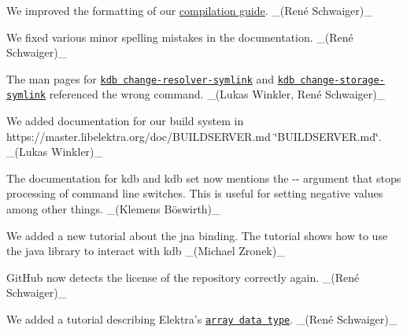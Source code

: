 \begin{DoxyItemize}
\item We improved the formatting of our \hyperlink{doc_COMPILE_md}{compilation guide}. \+\_\+(René Schwaiger)\+\_\+
\item We fixed various minor spelling mistakes in the documentation. \+\_\+(René Schwaiger)\+\_\+
\item The man pages for \href{https://www.libelektra.org/manpages/kdb-change-resolver-symlink}{\tt {\ttfamily kdb change-\/resolver-\/symlink}} and \href{https://www.libelektra.org/manpages/kdb-change-storage-symlink}{\tt {\ttfamily kdb change-\/storage-\/symlink}} referenced the wrong command. \+\_\+(Lukas Winkler, René Schwaiger)\+\_\+
\item We added documentation for our build system in https\+://master.libelektra.\+org/doc/\+B\+U\+I\+L\+D\+S\+E\+R\+V\+ER.md \char`\"{}\+B\+U\+I\+L\+D\+S\+E\+R\+V\+E\+R.\+md\char`\"{}. \+\_\+(\+Lukas Winkler)\+\_\+
\item The documentation for {\ttfamily kdb} and {\ttfamily kdb set} now mentions the {\ttfamily -\/-\/} argument that stops processing of command line switches. This is useful for setting negative values among other things. \+\_\+(Klemens Böswirth)\+\_\+
\item We added a new tutorial about the jna binding. The tutorial shows how to use the java library to interact with kdb \+\_\+(\+Michael Zronek)\+\_\+
\item Git\+Hub now detects the license of the repository correctly again. \+\_\+(René Schwaiger)\+\_\+
\item We added a tutorial describing Elektra’s \href{https://www.libelektra.org/tutorials/arrays}{\tt array data type}. \+\_\+(René Schwaiger)\+\_\+
\end{DoxyItemize}


